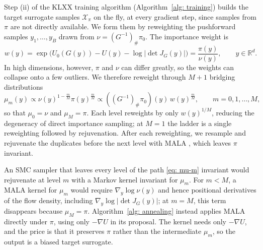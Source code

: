 \documentclass{article}
\begin{document}
Step (ii) of the KLXX training algorithm (Algorithm~\ref{alg: training}) builds the target surrogate samples $\mathcal X_{\pi}$ on the fly, at every gradient step, since samples from $\pi$ are not directly available. We form them by reweighting the pushforward samples $y_1,\dots,y_B$ drawn from $\nu=(G^{-1})_{\#}\pi_0$. The importance weight is
\begin{equation}
	w(y)
	= \exp\Big( U_0(G(y)) - U(y) - \log|\det J_G(y)| \Big)
	= \frac{\pi(y)}{\nu(y)},
	\qquad y \in \mathbb R^d.
	\label{eq: weight}
\end{equation}
In high dimensions, however, $\pi$ and $\nu$ can differ greatly, so the weights can collapse onto a few outliers. We therefore reweight through $M+1$ bridging distributions
\begin{equation}
	\mu_m(y) \propto \nu(y)^{1-\frac{m}{M}} \pi(y)^{\frac{m}{M}} \propto ((G^{-1})_{\#}\pi_0)(y)\, w(y)^{\frac{m}{M}}, \qquad m = 0,1,\dots,M,
	\label{eq: mu-m}
\end{equation}
so that $\mu_0 = \nu$ and $\mu_M = \pi$. Each level reweights by only $w(y)^{1/M}$, reducing the degeneracy of direct importance sampling; at $M=1$ the ladder is a single reweighting followed by rejuvenation.
After each reweighting, we resample and rejuvenate the duplicates before the next level with MALA \citep{roberts1996exponential}, which leaves $\pi$ invariant.


\begin{algorithm}[htb]
	\caption{SMC for a biased target surrogate}
	\label{alg: annealing}
	
\end{algorithm}
\medskip
\noindent
An SMC sampler that leaves every level of the path \eqref{eq: mu-m} invariant would rejuvenate at level $m$ with a Markov kernel invariant for $\mu_m$. For $m<M$, a MALA kernel for $\mu_m$ would require $\nabla_y\log\nu(y)$ and hence positional derivatives of the flow density, including $\nabla_y\log|\det J_G(y)|$; at $m=M$, this term disappears because $\mu_M=\pi$. Algorithm~\ref{alg: annealing} instead applies MALA directly under $\pi$, using only $-\nabla U$ in its proposal. The kernel needs only $-\nabla U$, and the price is that it preserves $\pi$ rather than the intermediate $\mu_m$, so the output is a biased target surrogate.
\end{document}
